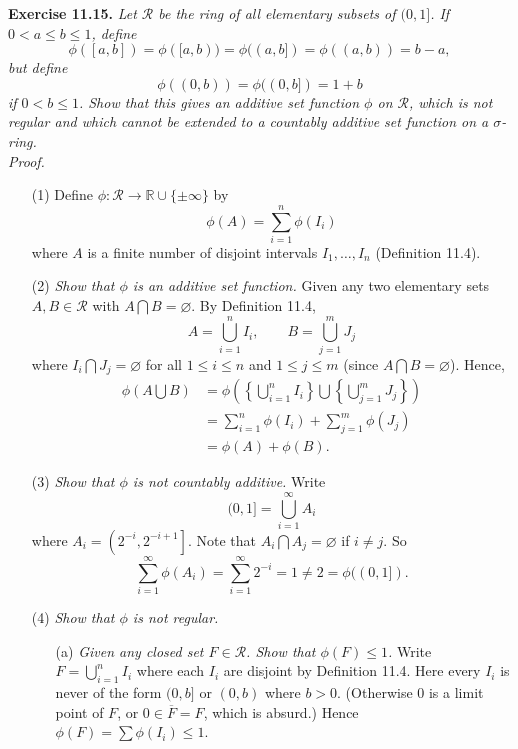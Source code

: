 \documentclass{article}
\begin{document}



\textbf{Exercise 11.15.}
\emph{Let $\mathscr{R}$ be the ring of all elementary subsets of $(0,1]$.
If $0 < a \leq b \leq 1$, define
\[
  \phi([a,b])
  = \phi([a,b))
  = \phi((a,b])
  = \phi((a,b))
  = b-a,
\]
but define
\[
  \phi((0,b)) = \phi((0,b]) = 1+b
\]
if $0 < b \leq 1$.
Show that this gives an additive set function $\phi$ on $\mathscr{R}$,
which is not regular and
which cannot be extended to a countably additive set function on a $\sigma$-ring.} \\

\emph{Proof.}
\begin{enumerate}
\item[(1)]
  Define $\phi: \mathscr{R} \to \mathbb{R} \cup \{ \pm \infty \}$ by
  \[
    \phi(A) = \sum_{i=1}^{n} \phi(I_i)
  \]
  where $A$ is a finite number of disjoint intervals $I_1, \ldots, I_n$ (Definition 11.4).

\item[(2)]
  \emph{Show that $\phi$ is an additive set function.}
  Given any two elementary sets $A, B \in \mathscr{R}$ with $A \bigcap B = \varnothing$.
  By Definition 11.4,
  \[
    A = \bigcup_{i=1}^{n} I_i,
    \qquad
    B = \bigcup_{j=1}^{m} J_j
  \]
  where $I_i \bigcap J_j = \varnothing$ for all $1 \leq i \leq n$ and $1 \leq j \leq m$
  (since $A \bigcap B = \varnothing$).
  Hence,
  \begin{align*}
    \phi\left(A \bigcup B\right)
    &= \phi\left( \left\{ \bigcup_{i=1}^{n} I_i \right\}
      \bigcup \left\{ \bigcup_{j=1}^{m} J_j \right\} \right) \\
    &= \sum_{i=1}^{n} \phi(I_i) + \sum_{j=1}^{m} \phi(J_j) \\
    &= \phi(A) + \phi(B).
  \end{align*}

\item[(3)]
  \emph{Show that $\phi$ is not countably additive.}
  Write
  \[
    (0,1]
    = \bigcup_{i=1}^{\infty} A_i
  \]
  where $A_i = \left( 2^{-i},2^{-i+1} \right]$.
  Note that $A_i \bigcap A_j = \varnothing$ if $i \neq j$.
  So
  \[
    \sum_{i=1}^{\infty} \phi(A_i)
    = \sum_{i=1}^{\infty} 2^{-i}
    = 1
    \neq 2
    = \phi((0,1]).
  \]

\item[(4)]
  \emph{Show that $\phi$ is not regular.}
  \begin{enumerate}
  \item[(a)]
    \emph{Given any closed set $F \in \mathscr{R}$. Show that $\phi(F) \leq 1$.}
    Write $F = \bigcup_{i=1}^{n} I_i$ where each $I_i$ are disjoint by Definition 11.4.
    Here every $I_i$ is never of the form $(0,b]$ or $(0,b)$ where $b > 0$.
    (Otherwise $0$ is a limit point of $F$, or $0 \in \overline{F} = F$,
    which is absurd.)
    Hence $\phi(F) = \sum \phi(I_i) \leq 1$.


\end{enumerate}
\end{enumerate}
\end{document}
